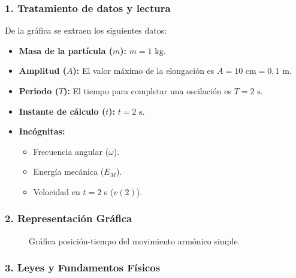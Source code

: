 \subsubsection*{1. Tratamiento de datos y lectura}
De la gráfica se extraen los siguientes datos:
\begin{itemize}
    \item \textbf{Masa de la partícula ($m$):} $m = 1 \text{ kg}$.
    \item \textbf{Amplitud ($A$):} El valor máximo de la elongación es $A = 10 \text{ cm} = 0,1 \text{ m}$.
    \item \textbf{Periodo ($T$):} El tiempo para completar una oscilación es $T = 2 \text{ s}$.
    \item \textbf{Instante de cálculo ($t$):} $t = 2 \text{ s}$.
    \item \textbf{Incógnitas:}
    \begin{itemize}
        \item Frecuencia angular ($\omega$).
        \item Energía mecánica ($E_M$).
        \item Velocidad en $t=2$ s ($v(2)$).
    \end{itemize}
\end{itemize}

\subsubsection*{2. Representación Gráfica}
\begin{figure}[H]
    \centering
    \caption{Gráfica posición-tiempo del movimiento armónico simple.}
\end{figure}

\subsubsection*{3. Leyes y Fundamentos Físicos}
